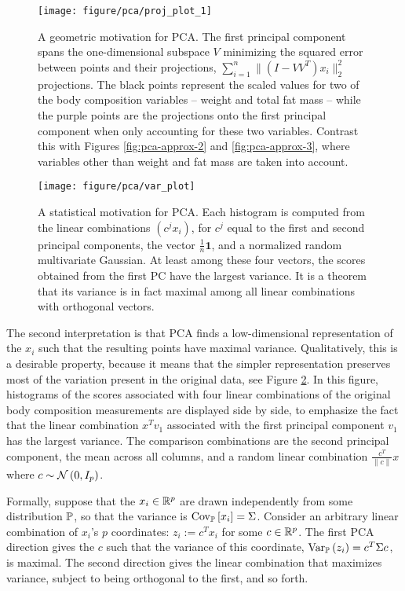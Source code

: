 \documentclass{article}
\begin{document}
\begin{figure}
  \texttt{[image: figure/pca/proj\_plot\_1]}
  \caption{A geometric motivation for PCA. The first principal component spans
    the one-dimensional subspace $V$ minimizing the squared error between points
    and their projections, $\sum_{i = 1}^{n}\|\left(I -
    VV^{T}\right)x_{i}\|_{2}^{2}$ projections. The black points represent the
    scaled values for two of the body composition variables -- weight and total
    fat mass -- while the purple points are the projections onto the first
    principal component when only accounting for these two variables. Contrast
    this with Figures \ref{fig:pca-approx-2} and \ref{fig:pca-approx-3}, where
    variables other than weight and fat mass are taken into account.}
  \label{fig:pca-approx}
\end{figure}

\begin{figure}
  \texttt{[image: figure/pca/var\_plot]}
  \caption{A statistical motivation for PCA. Each histogram is computed from the
    linear combinations $\left(c^{j}x_{i}\right)$, for $c^{j}$ equal to the
    first and second principal components, the vector $\frac{1}{n}\mathbf{1}$,
    and a normalized random multivariate Gaussian. At least among these four
    vectors, the scores obtained from the first PC have the largest variance. It
    is a theorem that its variance is in fact maximal among all linear
    combinations with orthogonal vectors.}
  \label{fig:pca-var}
\end{figure}

The second interpretation is that PCA finds a low-dimensional representation of
the $x_{i}$ such that the resulting points have maximal variance. Qualitatively,
this is a desirable property, because it means that the simpler representation
preserves most of the variation present in the original data, see Figure
\ref{fig:pca-var}. In this figure, histograms of the scores associated with four
linear combinations of the original body composition measurements are displayed
side by side, to emphasize the fact that the linear combination $x^{T}v_{1}$
associated with the first principal component $v_{1}$ has the largest variance.
The comparison combinations are the second principal component, the mean across
all columns, and a random linear combination $\frac{c^{T}}{\|c\|} x$ where $c \sim
\Gsn\left(0, I_{p}\right)$.

Formally, suppose that the $x_{i}\in\reals^{p}$ are drawn
independently from some distribution $\P$, so that the variance is
$\Covsubarg{\P}{x_{i}} = \Sigma$. Consider an arbitrary linear combination of
$x_{i}$'s $p$ coordinates: $z_{i} := c^{T}x_{i}$ for some $c \in \reals^{p}$.
The first PCA direction gives the $c$ such that the variance of this coordinate,
$\Varsubarg{\P}{z_{i}} = c^{T}\Sigma c$, is maximal. The second direction gives
the linear combination that maximizes variance, subject to being orthogonal to
the first, and so forth.
\end{document}
